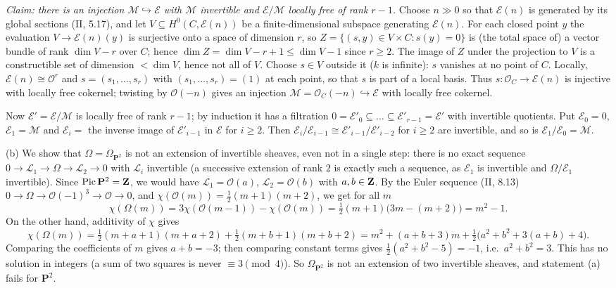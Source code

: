 \documentclass[11pt]{article}
\begin{document}
\emph{Claim: there is an injection $\mathcal M\hookrightarrow\mathcal E$ with $\mathcal M$ invertible and $\mathcal E/\mathcal M$ locally free of rank $r-1$.} Choose $n\gg0$ so that $\mathcal E(n)$ is generated by its global sections (II, 5.17), and let $V\subseteq H^0(C,\mathcal E(n))$ be a finite-dimensional subspace generating $\mathcal E(n)$. For each closed point $y$ the evaluation $V\to\mathcal E(n)(y)$ is surjective onto a space of dimension $r$, so $Z=\{(s,y)\in V\times C: s(y)=0\}$ is (the total space of) a vector bundle of rank $\dim V-r$ over $C$; hence $\dim Z=\dim V-r+1\le\dim V-1$ since $r\ge2$. The image of $Z$ under the projection to $V$ is a constructible set of dimension $<\dim V$, hence not all of $V$. Choose $s\in V$ outside it ($k$ is infinite): $s$ vanishes at no point of $C$. Locally, $\mathcal E(n)\cong\mathcal O^r$ and $s=(s_1,\dots,s_r)$ with $(s_1,\dots,s_r)=(1)$ at each point, so that $s$ is part of a local basis. Thus $s\colon\mathcal O_C\to\mathcal E(n)$ is injective with locally free cokernel; twisting by $\mathcal O(-n)$ gives an injection $\mathcal M=\mathcal O_C(-n)\hookrightarrow\mathcal E$ with locally free cokernel.

Now $\mathcal E'=\mathcal E/\mathcal M$ is locally free of rank $r-1$; by induction it has a filtration $0=\mathcal E'_0\subseteq\dots\subseteq\mathcal E'_{r-1}=\mathcal E'$ with invertible quotients. Put $\mathcal E_0=0$, $\mathcal E_1=\mathcal M$ and $\mathcal E_{i}=$ the inverse image of $\mathcal E'_{i-1}$ in $\mathcal E$ for $i\ge2$. Then $\mathcal E_i/\mathcal E_{i-1}\cong\mathcal E'_{i-1}/\mathcal E'_{i-2}$ for $i\ge2$ are invertible, and so is $\mathcal E_1/\mathcal E_0=\mathcal M$.

(b) We show that $\Omega=\Omega_{\mathbf P^2}$ is not an extension of invertible sheaves, even not in a single step: there is no exact sequence $0\to\mathcal L_1\to\Omega\to\mathcal L_2\to0$ with $\mathcal L_i$ invertible (a successive extension of rank $2$ is exactly such a sequence, as $\mathcal E_1$ is invertible and $\Omega/\mathcal E_1$ invertible). Since $\operatorname{Pic}\mathbf P^2=\mathbf Z$, we would have $\mathcal L_1=\mathcal O(a)$, $\mathcal L_2=\mathcal O(b)$ with $a,b\in\mathbf Z$. By the Euler sequence (II, 8.13) $0\to\Omega\to\mathcal O(-1)^3\to\mathcal O\to0$, and $\chi(\mathcal O(m))=\frac12(m+1)(m+2)$, we get for all $m$
\[ \chi(\Omega(m))=3\chi(\mathcal O(m-1))-\chi(\mathcal O(m))=\tfrac12(m+1)\bigl(3m-(m+2)\bigr)=m^2-1. \]
On the other hand, additivity of $\chi$ gives
\[ \chi(\Omega(m))=\tfrac12(m+a+1)(m+a+2)+\tfrac12(m+b+1)(m+b+2)=m^2+(a+b+3)m+\tfrac12\bigl(a^2+b^2+3(a+b)+4\bigr). \]
Comparing the coefficients of $m$ gives $a+b=-3$; then comparing constant terms gives $\frac12(a^2+b^2-5)=-1$, i.e.\ $a^2+b^2=3$. This has no solution in integers (a sum of two squares is never $\equiv3\pmod 4$). So $\Omega_{\mathbf P^2}$ is not an extension of two invertible sheaves, and statement (a) fails for $\mathbf P^2$.
\end{document}
